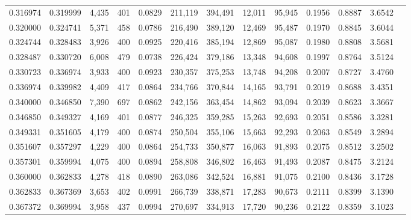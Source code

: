 \begin{tabular}{rrrrrrrrrrrrr}
0.316974 & 0.319999 &  4,435 &   401 &                                     0.0829 & 211,119 & 394,491 &  12,011 &  95,945 & 0.1956 & 0.8887 & 3.6542 \\
0.320000 & 0.324741 &  5,371 &   458 &                                     0.0786 & 216,490 & 389,120 &  12,469 &  95,487 & 0.1970 & 0.8845 & 3.6044 \\
0.324744 & 0.328483 &  3,926 &   400 &                                     0.0925 & 220,416 & 385,194 &  12,869 &  95,087 & 0.1980 & 0.8808 & 3.5681 \\
0.328487 & 0.330720 &  6,008 &   479 &                                     0.0738 & 226,424 & 379,186 &  13,348 &  94,608 & 0.1997 & 0.8764 & 3.5124 \\
0.330723 & 0.336974 &  3,933 &   400 &                                     0.0923 & 230,357 & 375,253 &  13,748 &  94,208 & 0.2007 & 0.8727 & 3.4760 \\
0.336974 & 0.339982 &  4,409 &   417 &                                     0.0864 & 234,766 & 370,844 &  14,165 &  93,791 & 0.2019 & 0.8688 & 3.4351 \\
0.340000 & 0.346850 &  7,390 &   697 &                                     0.0862 & 242,156 & 363,454 &  14,862 &  93,094 & 0.2039 & 0.8623 & 3.3667 \\
0.346850 & 0.349327 &  4,169 &   401 &                                     0.0877 & 246,325 & 359,285 &  15,263 &  92,693 & 0.2051 & 0.8586 & 3.3281 \\
0.349331 & 0.351605 &  4,179 &   400 &                                     0.0874 & 250,504 & 355,106 &  15,663 &  92,293 & 0.2063 & 0.8549 & 3.2894 \\
0.351607 & 0.357297 &  4,229 &   400 &                                     0.0864 & 254,733 & 350,877 &  16,063 &  91,893 & 0.2075 & 0.8512 & 3.2502 \\
0.357301 & 0.359994 &  4,075 &   400 &                                     0.0894 & 258,808 & 346,802 &  16,463 &  91,493 & 0.2087 & 0.8475 & 3.2124 \\
0.360000 & 0.362833 &  4,278 &   418 &                                     0.0890 & 263,086 & 342,524 &  16,881 &  91,075 & 0.2100 & 0.8436 & 3.1728 \\
0.362833 & 0.367369 &  3,653 &   402 &                                     0.0991 & 266,739 & 338,871 &  17,283 &  90,673 & 0.2111 & 0.8399 & 3.1390 \\
0.367372 & 0.369994 &  3,958 &   437 &                                     0.0994 & 270,697 & 334,913 &  17,720 &  90,236 & 0.2122 & 0.8359 & 3.1023 \\

\end{tabular}
